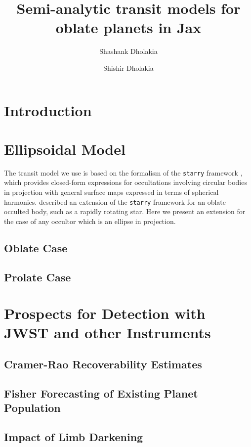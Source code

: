 \documentclass[twocolumn]{aastex631}
\begin{document}
\title{Semi-analytic transit models for oblate planets in Jax}

\author{Shashank Dholakia} \author{Shishir Dholakia}

\begin{abstract}

\end{abstract}

\section{Introduction}
\label{sec:intro}


\section{Ellipsoidal Model}
\label{sec:model}
The transit model we use is based on the formalism of the \texttt{starry} framework \citep{starry2019}, which provides closed-form expressions for occultations involving circular bodies in projection with general surface maps expressed in terms of spherical harmonics. \citet{dholakia2022} described an extension of the \texttt{starry} framework for an oblate occulted body, such as a rapidly rotating star. Here we present an extension for the case of any occultor which is an ellipse in projection. 

\subsection{Oblate Case}
\subsection{Prolate Case}
\section{Prospects for Detection with JWST and other Instruments}
\label{sec:jwstdetect}
\subsection{Cramer-Rao Recoverability Estimates}
\label{sec:rec}
\subsection{Fisher Forecasting of Existing Planet Population}
\label{sec:fisherforecasting}
\subsection{Impact of Limb Darkening}
\end{document}
